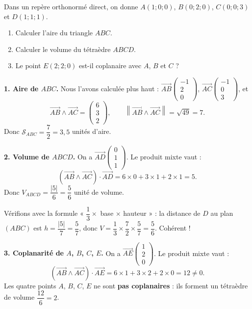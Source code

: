 \documentclass[11pt]{article}
\begin{document}
\begin{exoresolu}
Dans un repère orthonormé direct, on donne $A(1;0;0)$, $B(0;2;0)$, $C(0;0;3)$ et $D(1;1;1)$.
\begin{enumerate}
\item Calculer l'aire du triangle $ABC$.
\item Calculer le volume du tétraèdre $ABCD$.
\item Le point $E(2;2;0)$ est-il coplanaire avec $A$, $B$ et $C$ ?
\end{enumerate}
\tcblower
\textbf{1. Aire de $ABC$.} Nous l'avons calculée plus haut : $\overrightarrow{AB}\begin{pmatrix} -1 \\ 2 \\ 0 \end{pmatrix}$, $\overrightarrow{AC}\begin{pmatrix} -1 \\ 0 \\ 3 \end{pmatrix}$, et
\[ \overrightarrow{AB} \wedge \overrightarrow{AC} = \begin{pmatrix} 6 \\ 3 \\ 2 \end{pmatrix}, \qquad \left\| \overrightarrow{AB} \wedge \overrightarrow{AC} \right\| = \sqrt{49} = 7. \]
Donc $\mathcal{S}_{ABC} = \dfrac{7}{2} = 3,5$ unités d'aire.

\textbf{2. Volume de $ABCD$.} On a $\overrightarrow{AD}\begin{pmatrix} 0 \\ 1 \\ 1 \end{pmatrix}$. Le produit mixte vaut :
\[ \left( \overrightarrow{AB} \wedge \overrightarrow{AC} \right) \cdot \overrightarrow{AD} = 6 \times 0 + 3 \times 1 + 2 \times 1 = 5. \]
Donc $V_{ABCD} = \dfrac{|5|}{6} = \dfrac{5}{6}$ unité de volume.

Vérifions avec la formule « $\dfrac{1}{3} \times$ base $\times$ hauteur » : la distance de $D$ au plan $(ABC)$ est $h = \dfrac{|5|}{7} = \dfrac{5}{7}$, donc $V = \dfrac{1}{3} \times \dfrac{7}{2} \times \dfrac{5}{7} = \dfrac{5}{6}$. Cohérent !

\textbf{3. Coplanarité de $A$, $B$, $C$, $E$.} On a $\overrightarrow{AE}\begin{pmatrix} 1 \\ 2 \\ 0 \end{pmatrix}$. Le produit mixte vaut :
\[ \left( \overrightarrow{AB} \wedge \overrightarrow{AC} \right) \cdot \overrightarrow{AE} = 6 \times 1 + 3 \times 2 + 2 \times 0 = 12 \neq 0. \]
Les quatre points $A$, $B$, $C$, $E$ ne sont \textbf{pas coplanaires} : ils forment un tétraèdre de volume $\dfrac{12}{6} = 2$.
\end{exoresolu}
\end{document}
